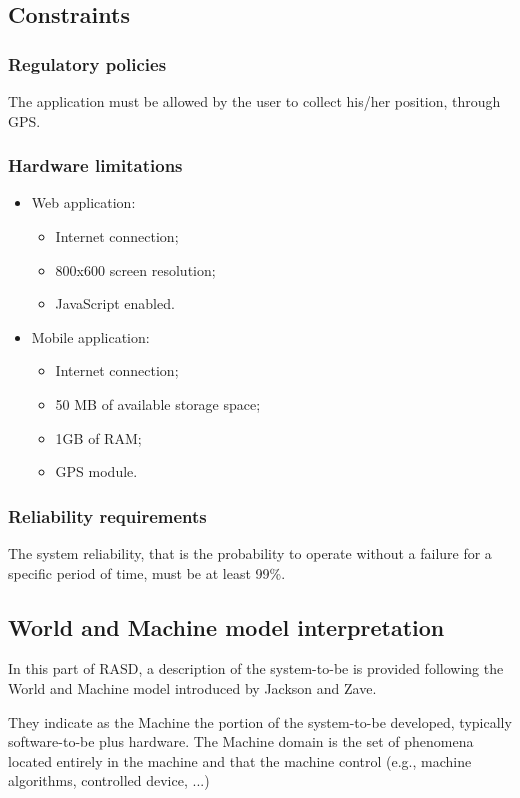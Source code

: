 \documentclass{article}
\begin{document}
	
	\subsection{Constraints}
	
	
	\subsubsection{Regulatory policies}
	The application must be allowed by the user to collect his/her position, through GPS.
	
	
	\subsubsection{Hardware limitations}
	\begin{itemize}
		\item Web application:
			\begin{itemize}
				\item Internet connection;
				\item 800x600 screen resolution;
				\item JavaScript enabled.
			\end{itemize}
		\item Mobile application:
			\begin{itemize}
				\item Internet connection;
				\item 50 MB of available storage space;
				\item 1GB of RAM;
				\item GPS module.
			\end{itemize}
	\end{itemize}
	
	
	\subsubsection{Reliability requirements}
	The system reliability, that is the probability to operate without a failure for a specific period of time, must be at least 99\%.
	
	
	\subsection{World and Machine model interpretation}
	In this part of RASD, a description of the system-to-be is provided following the World and Machine model introduced by Jackson and Zave.
	
	\bigskip
	They indicate as the Machine the portion of the system-to-be developed, typically software-to-be plus hardware. The Machine domain is the set of phenomena located entirely in the machine and that the machine control (e.g., machine algorithms, controlled device, ...)
	
\end{document}
